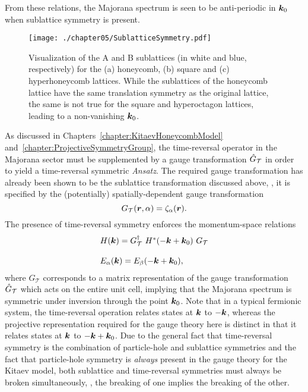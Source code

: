 From these relations, the Majorana spectrum is seen to be anti-periodic in $\bm{k}_0$ when sublattice symmetry is present.
%
\begin{figure}[tb]
	\centering
	\texttt{[image: ./chapter05/SublatticeSymmetry.pdf]}
	\caption{
		Visualization of the A and B sublattices (in white and blue, respectively) for the (a) honeycomb, (b) square and (c) hyperhoneycomb lattices.
		While the sublattices of the honeycomb lattice have the same translation symmetry as the original lattice, the same is not true for the square and hyperoctagon lattices, leading to a non-vanishing $\bm{k}_0$.
	}
	\label{fig:chapter05_Sublattices}
\end{figure}
%

As discussed in Chapters~\ref{chapter:KitaevHoneycombModel} and~\ref{chapter:ProjectiveSymmetryGroup}, the time-reversal operator in the Majorana sector must be supplemented by a gauge transformation $\hat{G}_{\mathcal{T}}$ in order to yield a time-reversal symmetric \textit{Ansatz}.
The required gauge transformation has already been shown to be the sublattice transformation discussed above, \ie, it is specified by the (potentially) spatially-dependent gauge transformation
%
\begin{equation}
	G_{\mathcal{T}}(\bm{r}, \alpha) = \zeta_{\alpha}(\bm{r}).
\end{equation}
%
The presence of time-reversal symmetry enforces the momentum-space relations
%
\begin{equation}
	\begin{matrix*}[l]
		H(\bk) = G\dag_{\mathcal{T}}~H^*(-\bk + \bk_0)~G_{\mathcal{T}} \\
		\\
		E_{\alpha}(\bk) = E_{\beta}(-\bk + \bk_0),
	\end{matrix*}
\end{equation}
%
where $G_{\mathcal{T}}$ corresponds to a matrix representation of the gauge transformation $\hat{G}_{\mathcal{T}}$ which acts on the entire unit cell, implying that the Majorana spectrum is symmetric under inversion through the point $\bm{k}_0$.
Note that in a typical fermionic system, the time-reversal operation relates states at $\bm{k}$ to $-\bm{k}$, whereas the projective representation required for the gauge theory here is distinct in that it relates states at $\bm{k}$ to $-\bm{k} + \bm{k}_0$.
Due to the general fact that time-reversal symmetry is the combination of particle-hole and sublattice symmetries and the fact that particle-hole symmetry is \textit{always} present in the gauge theory for the Kitaev model, both sublattice and time-reversal symmetries must always be broken simultaneously, \ie, the breaking of one implies the breaking of the other.


